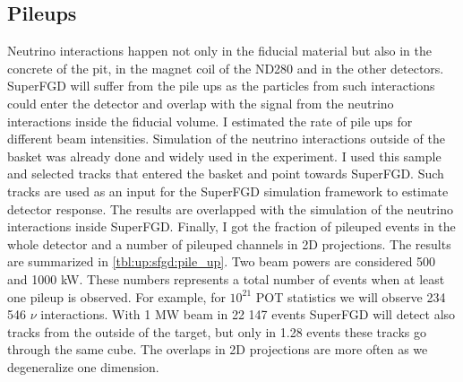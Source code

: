 \documentclass[main.tex]{subfiles}
\begin{document}
\subsection{Pileups}
\label{sec:up:sfgd:pu}
Neutrino interactions happen not only in the fiducial material but also in the concrete of the pit, in the magnet coil of the ND280 and in the other detectors. SuperFGD will suffer from the pile ups as the particles from such interactions could enter the detector and overlap with the signal from the neutrino interactions inside the fiducial volume. I estimated the rate of pile ups for different beam intensities. Simulation of the neutrino interactions outside of the basket was already done and widely used in the experiment. I used this sample and selected tracks that entered the basket and point towards SuperFGD. Such tracks are used as an input for the SuperFGD simulation framework to estimate detector response. The results are overlapped with the simulation of the neutrino interactions inside SuperFGD. Finally, I got the fraction of pileuped events in the whole detector and a number of pileuped channels in 2D projections. The results are summarized in \autoref{tbl:up:sfgd:pile_up}. Two beam powers are considered 500 and 1000 kW. These numbers represents a total number of events when at least one pileup is observed. For example, for $10^{21}$ POT statistics we will observe 234 546 $\nu$ interactions. With 1 MW beam in 22 147 events SuperFGD will detect also tracks from the outside of the target, but only in 1.28 events these tracks go through the same cube. The overlaps in 2D projections are more often as we degeneralize one dimension.
\end{document}
